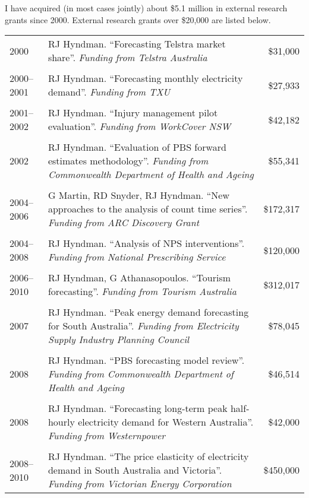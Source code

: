 \documentclass[10pt,a4paper,]{article}
\begin{document}
I have acquired (in most cases jointly) about \$5.1 million in external research grants since 2000. External research grants over \$20,000 are listed below.\vspace*{0.2cm}

\begingroup\fontsize{10}{16}
\begin{tabular}{lp{13.3cm}r}
   \hline
2000 & RJ Hyndman. ``Forecasting Telstra market share''. \emph{Funding from Telstra Australia} & \$31,000 \\ 
   \\[-0.2cm]2000--2001 & RJ Hyndman. ``Forecasting monthly electricity demand''. \emph{Funding from TXU} & \$27,933 \\ 
   \\[-0.2cm]2001--2002 & RJ Hyndman. ``Injury management pilot evaluation''. \emph{Funding from WorkCover NSW} & \$42,182 \\ 
   \\[-0.2cm]2002 & RJ Hyndman. ``Evaluation of PBS forward estimates methodology''. \emph{Funding from Commonwealth Department of Health and Ageing} & \$55,341 \\ 
   \\[-0.2cm]2004--2006 & G Martin, RD Snyder, RJ Hyndman. ``New approaches to the analysis of count time series''. \emph{Funding from ARC Discovery Grant} & \$172,317 \\ 
   \\[-0.2cm]2004--2008 & RJ Hyndman. ``Analysis of NPS interventions''. \emph{Funding from National Prescribing Service} & \$120,000 \\ 
   \\[-0.2cm]2006--2010 & RJ Hyndman, G Athanasopoulos. ``Tourism forecasting''. \emph{Funding from Tourism Australia} & \$312,017 \\ 
   \\[-0.2cm]2007 & RJ Hyndman. ``Peak energy demand forecasting for South Australia''. \emph{Funding from Electricity Supply Industry Planning Council} & \$78,045 \\ 
   \\[-0.2cm]2008 & RJ Hyndman. ``PBS forecasting model review''. \emph{Funding from Commonwealth Department of Health and Ageing} & \$46,514 \\ 
   \\[-0.2cm]2008 & RJ Hyndman. ``Forecasting long-term peak half-hourly electricity demand for Western Australia''. \emph{Funding from Westernpower} & \$42,000 \\ 
   \\[-0.2cm]2008--2010 & RJ Hyndman. ``The price elasticity of electricity demand in South Australia and Victoria''. \emph{Funding from Victorian Energy Corporation} & \$450,000 \\ 

\end{tabular}
\end{document}
